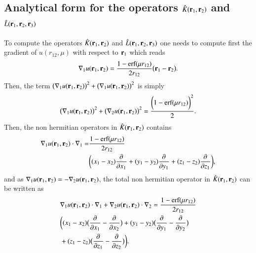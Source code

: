 \documentclass[aip,jcp,reprint,noshowkeys,superscriptaddress]{revtex4-1}
\newcommand{\deriv}[3]{\frac{\partial^{#3} #1}{\partial {#2}^{#3}}}
\newcommand{\br}[0]{{\bf {r}}}
\newcommand{\bri}[1]{{\bf r}_{#1}}
\begin{document}
\subsection{Analytical form for the operators $\hat{K}(\bri{1},\bri{2}) $ and $\hat{L}(\bri{1},\bri{2},\bri{3})$ }
To compute the operators $\hat{K}(\bri{1},\bri{2})$ and $\hat{L}(\bri{1},\bri{2},\bri{3}) $ one needs to compute first the gradient of $u(r_{12},\mu)$ with respect to $\bri{1}$ which reads 
\begin{equation}
 \label{eq:nabla_u}
 \begin{aligned}
 \nabla_1 u(\br{}_1,\br{}_2) = \frac{1 - \text{erf}(\mu r_{12})}{2 r_{12}} \big( \br{}_1 - \br{}_2 \big).
 \end{aligned}
\end{equation}
Then, the term $\big(\nabla_1 u(\bri{1},\bri{2}) \big) ^2 + \big(\nabla_1 u(\bri{1},\bri{2}) \big) ^2$ is simply 
\begin{equation}
 \begin{aligned}
 \big(\nabla_1 u(\bri{1},\bri{2}) \big) ^2 + \big(\nabla_2 u(\bri{1},\bri{2}) \big) ^2 = \frac{\bigg(1 - \text{erf}(\mu r_{12}) \bigg)^2}{2}.
 \end{aligned}
\end{equation}
Then, the non hermitian operators in $\hat{K}(\bri{1},\bri{2})$ contains 
\begin{equation}
 \begin{aligned}
 \nabla_1 u(\br{}_1,\br{}_2) \cdot \nabla_1  = &\frac{1 - \text{erf}(\mu r_{12})}{2 r_{12}} \\ 
                                          &\bigg( (x_1 - x_2) \deriv{}{x_1}{} + (y_1 - y_2) \deriv{}{y_1}{} + (z_1 - z_2) \deriv{}{z_1}{}\bigg),
 \end{aligned}
\end{equation}
and as $\nabla_1 u(\br{}_1,\br{}_2) = - \nabla_2 u(\br{}_1,\br{}_2)$,   
the total non hermitian operator in $\hat{K}(\bri{1},\bri{2})$ can be written as 
\begin{equation}
 \begin{aligned}
 \label{def_non_hermit}
& \nabla_1 u(\br{}_1,\br{}_2) \cdot \nabla_1 + \nabla_2 u(\br{}_1,\br{}_2) \cdot \nabla_2 = \frac{1 - \text{erf}(\mu r_{12})}{2 r_{12}} \\
& \bigg( (x_1 - x_2) \big( \deriv{}{x_1}{} - \deriv{}{x_2}{} \big) +
         (y_1 - y_2) \big( \deriv{}{y_1}{} - \deriv{}{y_2}{} \big)  \\
&  +      (z_1 - z_2) \big( \deriv{}{z_1}{} - \deriv{}{z_2}{} \big)\bigg).
 \end{aligned}
\end{equation}
\end{document}
